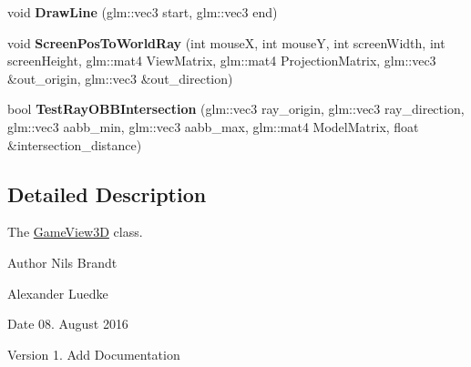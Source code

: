 \begin{DoxyCompactItemize}
\item 
\hypertarget{classGameView3D_a5e9b5ac73aaa4fedf3bbbec02544c184}{void {\bfseries Draw\-Line} (glm\-::vec3 start, glm\-::vec3 end)}\label{classGameView3D_a5e9b5ac73aaa4fedf3bbbec02544c184}

\item 
\hypertarget{classGameView3D_aa96228c70d0a93420abef7687518f809}{void {\bfseries Screen\-Pos\-To\-World\-Ray} (int mouse\-X, int mouse\-Y, int screen\-Width, int screen\-Height, glm\-::mat4 View\-Matrix, glm\-::mat4 Projection\-Matrix, glm\-::vec3 \&out\-\_\-origin, glm\-::vec3 \&out\-\_\-direction)}\label{classGameView3D_aa96228c70d0a93420abef7687518f809}

\item 
\hypertarget{classGameView3D_a301575899b1763b95a99e4c386f9356d}{bool {\bfseries Test\-Ray\-O\-B\-B\-Intersection} (glm\-::vec3 ray\-\_\-origin, glm\-::vec3 ray\-\_\-direction, glm\-::vec3 aabb\-\_\-min, glm\-::vec3 aabb\-\_\-max, glm\-::mat4 Model\-Matrix, float \&intersection\-\_\-distance)}\label{classGameView3D_a301575899b1763b95a99e4c386f9356d}

\end{DoxyCompactItemize}


\subsection{Detailed Description}
The \hyperlink{classGameView3D}{Game\-View3\-D} class. 

\begin{DoxyAuthor}{Author}
Nils Brandt 

Alexander Luedke
\end{DoxyAuthor}
\begin{DoxyDate}{Date}
08. August 2016
\end{DoxyDate}
\begin{DoxyVersion}{Version}
1. Add Documentation 
\end{DoxyVersion}
